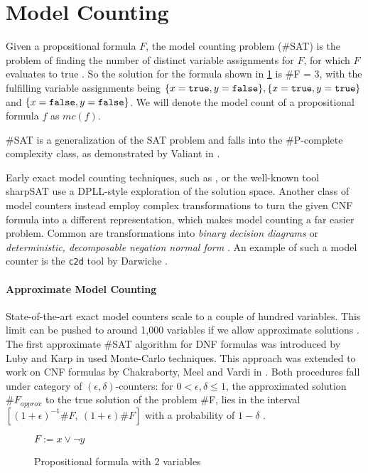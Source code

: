 \section{Model Counting}

Given a propositional formula $F$, the model counting problem (\#SAT) is the problem of finding the number of distinct variable assignments for $F$, for which $F$ evaluates to true \cite{biere09}. So the solution for the formula shown in  \ref{fig:satEx} is \#F = 3, with the fulfilling variable assignments being $\{ x = \mathtt{true}, y = \mathtt{false}\}, \{x = \mathtt{true}, y = \mathtt{true}\}$ and  $\{x = \mathtt{false}, y = \mathtt{false}\}$. We will denote the model count of a propositional formula $f$ as $mc(f)$.

\#SAT is a generalization of the SAT problem and falls into the \#P-complete complexity class, as demonstrated by Valiant in \cite{valiant79}.

Early exact model counting techniques, such as \cite{birnbaum99}, or the well-known tool sharpSAT \cite{thurley06} use a DPLL-style exploration of the solution space. Another class of model counters instead employ complex transformations to turn the given CNF formula into a different representation, which makes model counting a far easier problem. Common are transformations into \emph{binary decision diagrams} \cite{bdd} or \emph{deterministic, decomposable negation normal form} \cite{darwiche01}. An example of such a model counter is the \texttt{c2d} tool by Darwiche \cite{darwiche04}.

\paragraph*{Approximate Model Counting}
State-of-the-art exact model counters scale to a couple of hundred variables.  This limit can be pushed to around 1,000 variables if we allow approximate solutions \cite{biere09}.
The first approximate \#SAT algorithm for DNF formulas was introduced by Luby and Karp in \cite{karp89} used Monte-Carlo techniques. This approach was extended to work on CNF formulas by Chakraborty, Meel and Vardi in \cite{chakraborty13}. Both procedures fall under category of $(\epsilon, \delta)$-counters: for $0 < \epsilon, \delta \leq 1$, the approximated solution $\#F_{approx}$ to the true solution of the problem \#F, lies in the interval $[(1 + \epsilon)^{-1} \#F, \: (1 + \epsilon) \#F]$ with a probability of $1 - \delta$ \cite{karp89,chakraborty13}.

\begin{figure}
    \centering
    $F := x \lor \lnot y$
    \caption{Propositional formula with 2 variables}
    \label{fig:satEx}
\end{figure}


